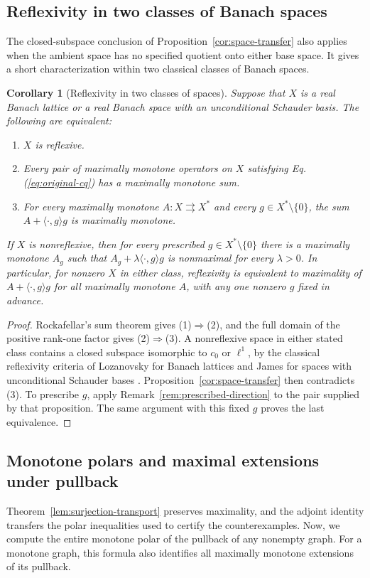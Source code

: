 \documentclass[11pt]{article}
\newcommand{\pair}[2]{\langle #1,#2\rangle}
\newtheorem{corollary}{Corollary}
\theoremstyle{definition}
\theoremstyle{remark}
\begin{document}
\subsection{Reflexivity in two classes of Banach spaces}
\label{subsec:main-class-reflexivity}
The closed-subspace conclusion of Proposition~\ref{cor:space-transfer} also applies when the ambient space has no specified quotient onto either base space. It gives a short characterization within two classical classes of Banach spaces.

\begin{corollary}[Reflexivity in two classes of spaces]
\label{cor:class-reflexivity}
Suppose that $X$ is a real Banach lattice or a real Banach space with an unconditional Schauder basis. The following are equivalent:
\begin{enumerate}
\item $X$ is reflexive.
\item Every pair of maximally monotone operators on $X$ satisfying Eq. (\ref{eq:original-cq}) has a maximally monotone sum.
\item For every maximally monotone $A:X\rightrightarrows X^*$ and every $g\in X^*\setminus\{0\}$, the sum $A+\pair{\cdot}{g}g$ is maximally monotone.
\end{enumerate}
If $X$ is nonreflexive, then for every prescribed $g\in X^*\setminus\{0\}$ there is a maximally monotone $A_g$ such that $A_g+\lambda\pair{\cdot}{g}g$ is nonmaximal for every $\lambda>0$. In particular, for nonzero $X$ in either class, reflexivity is equivalent to maximality of $A+\pair{\cdot}{g}g$ for all maximally monotone $A$, with any one nonzero $g$ fixed in advance.
\end{corollary}
\begin{proof}
Rockafellar's sum theorem gives (1)$\Rightarrow$(2), and the full domain of the positive rank-one factor gives (2)$\Rightarrow$(3). A nonreflexive space in either stated class contains a closed subspace isomorphic to $c_0$ or $\ell^1$, by the classical reflexivity criteria of Lozanovsky for Banach lattices and James for spaces with unconditional Schauder bases \cite{kitoverorhon2014,chenkaniaruan2022}. Proposition~\ref{cor:space-transfer} then contradicts (3). To prescribe $g$, apply Remark~\ref{rem:prescribed-direction} to the pair supplied by that proposition. The same argument with this fixed $g$ proves the last equivalence.
\end{proof}

\subsection{Monotone polars and maximal extensions under pullback}
\label{subsec:pullback-consequences}
Theorem~\ref{lem:surjection-transport} preserves maximality, and the adjoint identity transfers the polar inequalities used to certify the counterexamples. Now, we compute the entire monotone polar of the pullback of any nonempty graph. For a monotone graph, this formula also identifies all maximally monotone extensions of its pullback.
\end{document}
